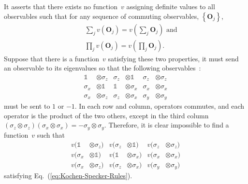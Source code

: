\documentclass[english,reprint, aps, prl,superscriptaddress, showpacs,
showkeys, longbibliography, amsmath, amssymb]{revtex4-1}
\theoremstyle{plain}
\theoremstyle{definition}
\begin{document}
It asserts that there exists no function~$v$ assigning definite
values to all observables such that for any sequence of commuting
observables, $\left\{ \mathbf{O}_{j}\right\} $,\begin{subequations}\label{eq:Kochen-Specker-Rules}
\begin{eqnarray}
 &  & \sum_{j}v\left(\mathbf{O}_{j}\right)=v\left(\sum_{j}\mathbf{O}_{j}\right)\textrm{ and}\\
 &  & \prod_{j}v\left(\mathbf{O}_{j}\right)=v\left(\prod_{j}\mathbf{O}_{j}\right).\label{eq:deterministic-product}
\end{eqnarray}
\end{subequations}Suppose that there is a function~$v$ satisfying
these two properties, it must send an observable to its eigenvalues
so that the following observables~\cite{Mermin1990Simple,peres1995quantum}:
\begin{equation}
\begin{aligned}\mathbb{1} & \otimes\sigma_{z} & \sigma_{z} & \otimes\mathbb{1} & \sigma_{z} & \otimes\sigma_{z}\\
\sigma_{x} & \otimes\mathbb{1} & \mathbb{1} & \otimes\sigma_{x} & \sigma_{x} & \otimes\sigma_{x}\\
\sigma_{x} & \otimes\sigma_{z} & \sigma_{z} & \otimes\sigma_{x} & \sigma_{y} & \otimes\sigma_{y}
\end{aligned}
\label{eq:MerminSquare}
\end{equation}
must be sent to $1$ or $-1$. In each row and column, operators commutes,
and each operator is the product of the two others, except in the
third column $\left(\sigma_{z}\otimes\sigma_{z}\right)\left(\sigma_{x}\otimes\sigma_{x}\right)=-\sigma_{y}\otimes\sigma_{y}$.
Therefore, it is clear impossible to find a function~$v$ such that
\begin{equation}
\begin{aligned}v(\mathbb{1} & \otimes\sigma_{z}) & v(\sigma_{z} & \otimes\mathbb{1}) & v(\sigma_{z} & \otimes\sigma_{z})\\
v(\sigma_{x} & \otimes\mathbb{1}) & v(\mathbb{1} & \otimes\sigma_{x}) & v(\sigma_{x} & \otimes\sigma_{x})\\
v(\sigma_{x} & \otimes\sigma_{z}) & v(\sigma_{z} & \otimes\sigma_{x}) & v(\sigma_{y} & \otimes\sigma_{y})
\end{aligned}
\label{eq:MerminSquare-values}
\end{equation}
satisfying Eq.~(\ref{eq:Kochen-Specker-Rules}).
\end{document}
